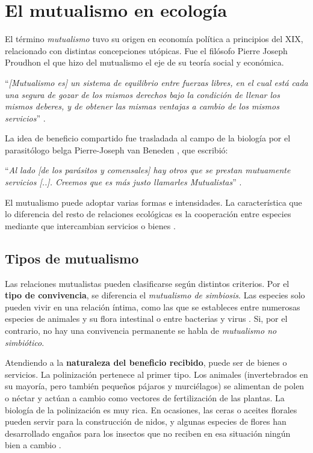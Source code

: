 \section{El mutualismo en ecología}

El término \textit{mutualismo} tuvo su origen en economía política a principios del XIX, relacionado con distintas concepciones utópicas. Fue el filósofo Pierre Joseph Proudhon el que hizo del mutualismo el eje de su teoría social y económica.

\enquote{\itshape [Mutualismo es] un sistema de equilibrio entre fuerzas libres, en el cual está cada una segura de gozar de los mismos derechos bajo la condición de llenar los mismos deberes, y 
de obtener las mismas ventajas a cambio de los mismos servicios} \cite{proudhon1868capacite}.

La idea de beneficio compartido fue trasladada al campo de la biología por el parasitólogo belga Pierre-Joseph van Beneden \cite{boucher1982ecology}, que escribió:

\enquote{\itshape Al lado [de los parásitos y comensales] hay otros que se prestan mutuamente servicios [..]. Creemos que es más justo llamarles Mutualistas} \cite{van1878commensaux}.

El mutualismo puede adoptar varias formas e intensidades. La característica que lo diferencia del resto de relaciones ecológicas es la cooperación entre especies mediante que intercambian servicios o bienes \cite{bronstein2001exploitation}.


\subsection{Tipos de mutualismo}
\label{TIPOS_DE_MUTUALISMO}
	
Las relaciones mutualistas pueden clasificarse según distintos criterios. Por el \textbf{tipo de convivencia}, se diferencia el \textit{mutualismo de simbiosis}. Las especies solo pueden vivir en una relación íntima, como las que se estableces entre numerosas especies de animales y su flora intestinal o entre bacterias y virus \cite{moran2005players}. Si, por el contrario, no hay una convivencia permanente se habla de \textit{mutualismo no simbiótico}.
	
Atendiendo a la \textbf{naturaleza del beneficio recibido}, puede ser de bienes o servicios. La polinización pertenece al primer tipo. Los animales (invertebrados en su mayoría, pero también pequeños pájaros y murciélagos) se alimentan de polen o néctar y actúan a cambio como vectores de fertilización de las plantas. La biología de la polinización es muy rica. En ocasiones, las ceras o aceites florales pueden servir para la construcción de nidos, y algunas especies de flores han desarrollado engaños para los insectos que no reciben en esa situación ningún bien a cambio \cite{rech2014biologia}.

